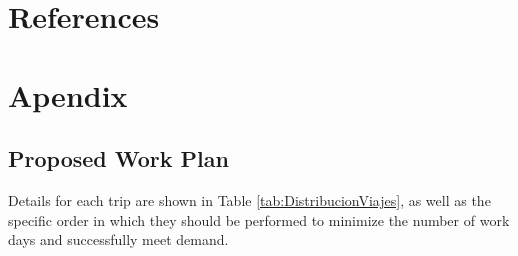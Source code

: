 \documentclass{amsart}
\begin{document}
    \section{References}
    \printbibliography[title={References}, heading=none]


    \newpage
    \section{Apendix}
    
        \subsection{Proposed Work Plan}
        Details for each trip are shown in Table \ref{tab:DistribucionViajes}, as well as the specific order in which they should be performed to minimize the number of work days and successfully meet demand.
        
\end{document}

